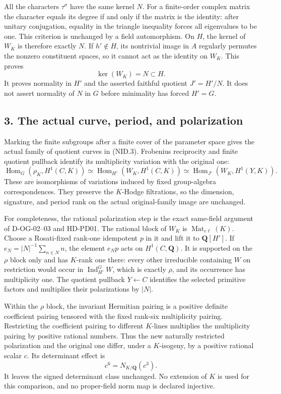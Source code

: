All the characters $\tau^\sigma$ have the same kernel $N$.
For a finite-order complex matrix the character equals its degree
if and only if the matrix is the identity: after unitary
conjugation, equality in the triangle inequality forces all
eigenvalues to be one.  This criterion is unchanged by a field
automorphism.  On $H$, the kernel of $W_K$ is therefore exactly $N$.
If $h'\notin H$, its nontrivial image in $A$ regularly permutes the
nonzero constituent spaces, so it cannot act as the identity on
$W_K$.  This proves
\[
                       \ker(W_K)=N\subset H.
 \tag{NID.10}
\]
It proves normality in $H'$ and the asserted faithful quotient
$J'=H'/N$.  It does not assert normality of $N$ in $G$ before
minimality has forced $H'=G$.

\subsection*{3. The actual curve, period, and polarization}

Marking the finite subgroups after a finite cover of the parameter
space gives the actual family of quotient curves in (NID.3).
Frobenius reciprocity and finite quotient pullback identify its
multiplicity variation with the original one:
\[
 \operatorname{Hom}_G(\rho_K,H^1(C,K))
  \simeq \operatorname{Hom}_{H'}(W_K,H^1(C,K))
  \simeq \operatorname{Hom}_{J'}(W_K,H^1(Y,K)).
 \tag{NID.11}
\]
These are isomorphisms of variations induced by fixed group-algebra
correspondences.  They preserve the $K$-Hodge filtrations, so the
dimension, signature, and period rank on the actual original-family
image are unchanged.

For completeness, the rational polarization step is the exact
same-field argument of D-OG-02--03 and HD-PD01.  The rational block
of $W_K$ is $\operatorname{Mat}_{e\ell}(K)$.  Choose a
Rosati-fixed rank-one idempotent $p$ in it and lift it to $\mathbf
Q[H']$.  If $e_N=|N|^{-1}\sum_{n\in N}n$, the element $e_Np$
acts on $H^1(C,\mathbf Q)$.  It is supported on the $\rho$ block
only and has $K$-rank one there: every other irreducible containing
$W$ on restriction would occur in $\operatorname{Ind}_{H'}^G W$,
which is exactly $\rho$, and its occurrence has multiplicity one.
The quotient pullback $Y\leftarrow C$ identifies the selected
primitive factors and multiplies their polarizations by $|N|$.

Within the $\rho$ block, the invariant Hermitian pairing is a
positive definite coefficient pairing tensored with the fixed
rank-six multiplicity pairing.  Restricting the coefficient pairing
to different $K$-lines multiplies the multiplicity pairing by
positive rational numbers.  Thus the new naturally restricted
polarization and the original one differ, under a $K$-isogeny, by
a positive rational scalar $c$.  Its determinant effect is
\[
                         c^6=N_{K/\mathbf Q}(c^3).
 \tag{NID.12}
\]
It leaves the signed determinant class unchanged.  No extension of
$K$ is used for this comparison, and no proper-field norm map is
declared injective.

